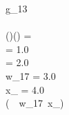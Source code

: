 \begin{FortressCode}
 g_{13} \\
  \\
(\ultrathin)\COLON (\ultrathin) =\;  \\
\2\+ = 1.0 \\
   = 2.0 \\
  w_{17} = 3.0 \\
  x_{} = 4.0 \\
  (\, \, w_{17}\, x_{})\- \\
 \\
\end{FortressCode}

